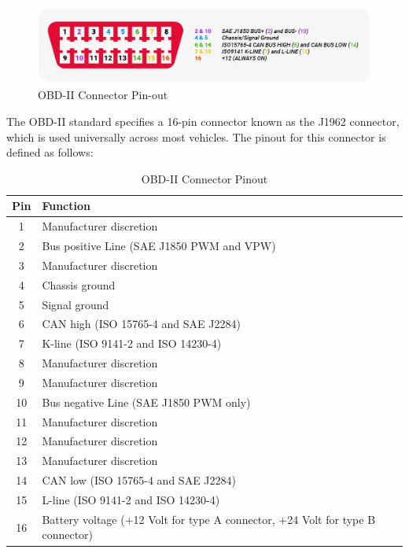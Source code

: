 \begin{enumerate}
    \begin{figure}[h!]
        \centering
        \includegraphics[width=13cm]{assets/obd_pinout.png}
        \caption{OBD-II Connector Pin-out}
        \label{fig:obd_pinout}
    \end{figure}

    The OBD-II standard specifies a 16-pin connector known as the J1962 connector, which is used universally across most vehicles. The pinout for this connector is defined as follows:

\begin{table}[h!]
    \centering
    \caption{OBD-II Connector Pinout}
    \label{table:obd_pinout}
    \renewcommand{\arraystretch}{2.5} %
    \begin{tabular}{|c|l|}
    \hline
    \textbf{Pin} & \textbf{Function} \\ \hline
    1  & Manufacturer discretion \\ \hline
    2  & Bus positive Line (SAE J1850 PWM and VPW) \\ \hline
    3  & Manufacturer discretion \\ \hline
    4  & Chassis ground \\ \hline
    5  & Signal ground \\ \hline
    6  & CAN high (ISO 15765-4 and SAE J2284) \\ \hline
    7  & K-line (ISO 9141-2 and ISO 14230-4) \\ \hline
    8  & Manufacturer discretion \\ \hline
    9  & Manufacturer discretion \\ \hline
    10 & Bus negative Line (SAE J1850 PWM only) \\ \hline
    11 & Manufacturer discretion \\ \hline
    12 & Manufacturer discretion \\ \hline
    13 & Manufacturer discretion \\ \hline
    14 & CAN low (ISO 15765-4 and SAE J2284) \\ \hline
    15 & L-line (ISO 9141-2 and ISO 14230-4) \\ \hline
    16 & Battery voltage (+12 Volt for type A connector, +24 Volt for type B connector) \\ \hline
    \end{tabular}
    \end{table}
    





\end{enumerate}
